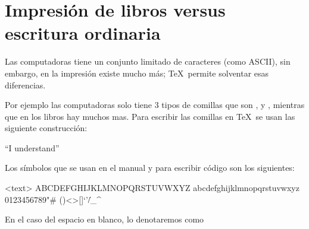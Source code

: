 \section{Impresión de libros versus escritura ordinaria}

Las computadoras tiene un conjunto limitado de caracteres (como
ASCII), sin embargo, en la impresión existe mucho más; \TeX\
permite solventar esas diferencias.

Por ejemplo las computadoras solo tiene 3 tipos de comillas que
son ,  y , mientras que en
los libros hay muchos mas. Para escribir las comillas en \TeX\ se
usan las siguiente construcción:
\begin{texexample}
  ``I understand''
\end{texexample}

Los símbolos que se usan en el manual y para escribir código son los siguientes:
\begin{codeblock}<text>
  ABCDEFGHIJKLMNOPQRSTUVWXYZ
  abcdefghijklmnopqrstuvwxyz
  0123456789"#%
  ()<>[]{}`'\|/_^~
\end{codeblock}

En el caso del espacio en blanco, lo denotaremos como \textvisiblespace
